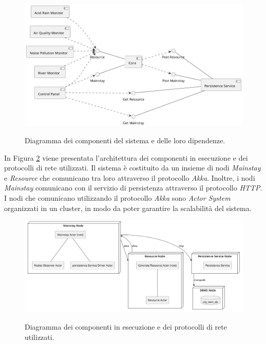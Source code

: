\documentclass[12pt]{article}
\begin{document}
\begin{figure}[H]
\caption{Diagramma dei componenti del sistema e delle loro dipendenze.}
    \includegraphics[width=\textwidth]{../assets/images/core-component-diagram.png}
    \label{fig:core-component-diagram}
\end{figure}

In Figura \ref{fig:nodes-component-diagram} viene presentata l'architettura dei componenti in esecuzione e dei protocolli di rete utilizzati. Il sistema è costituito da un insieme di nodi \textit{Mainstay} e \textit{Resource} che comunicano tra loro attraverso il protocollo \textit{Akka}. Inoltre, i nodi \textit{Mainstay} comunicano con il servizio di persistenza attraverso il protocollo \textit{HTTP}.
I nodi che comunicano utilizzando il protocollo \textit{Akka} sono \textit{Actor System} organizzati in un cluster, in modo da poter garantire la scalabilità del sistema.

\begin{figure}[H]
    \caption{Diagramma dei componenti in esecuzione e dei protocolli di rete utilizzati.}
    \includegraphics[width=\textwidth]{../assets/images/nodes-component-diagram.png}
    \label{fig:nodes-component-diagram}
\end{figure}
\end{document}
